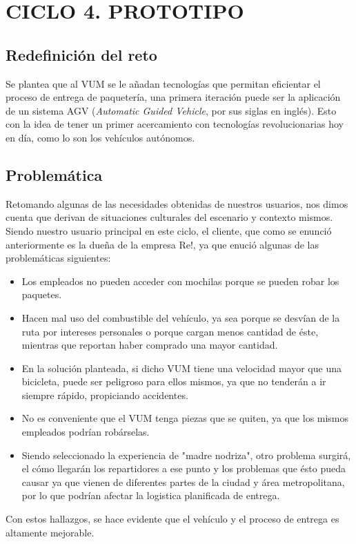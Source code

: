 \chapter{CICLO 4. PROTOTIPO}

\section{Redefinición del reto}

Se plantea que al VUM se le añadan tecnologías que permitan eficientar el proceso de entrega de paquetería, una primera iteración puede ser la aplicación de un sistema AGV (\textit{Automatic Guided Vehicle}, por sus siglas en inglés). Esto con la idea de tener un primer acercamiento con tecnologías revolucionarias hoy en día, como lo son los vehículos autónomos.

\section{Problemática}

Retomando algunas de las necesidades obtenidas de nuestros usuarios, nos dimos cuenta que derivan de situaciones culturales del escenario y contexto mismos. Siendo nuestro usuario principal en este ciclo, el cliente, que como se enunció anteriormente es la dueña de la empresa Re!, ya que enució algunas de las problemáticas siguientes:

\begin{itemize}
\item Los empleados no pueden acceder con mochilas porque se pueden robar los paquetes.

\item Hacen mal uso del combustible del vehículo, ya sea porque se desvían de la ruta por intereses personales o porque cargan menos cantidad de éste, mientras que reportan haber comprado una mayor cantidad.

\item En la solución planteada, si dicho VUM tiene una velocidad mayor que una bicicleta, puede ser peligroso para ellos mismos, ya que no tenderán a ir siempre rápido, propiciando accidentes.

\item No es conveniente que el VUM tenga piezas que se quiten, ya que los mismos empleados podrían robárselas.

\item Siendo seleccionado la experiencia de "madre nodriza", otro problema surgirá, el cómo llegarán los repartidores a ese punto y los problemas que ésto pueda causar ya que vienen de diferentes partes de la ciudad y área metropolitana, por lo que podrían afectar la logistica planificada de entrega.

\end{itemize}
Con estos hallazgos, se hace evidente que el vehículo y el proceso de entrega es altamente mejorable.

